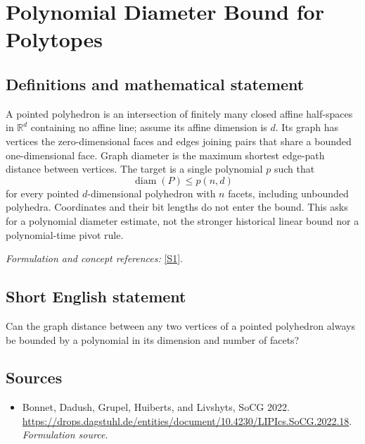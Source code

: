 \documentclass[11pt]{article}
\begin{document}
\section*{\texorpdfstring{Polynomial Diameter Bound for Polytopes}{Polynomial Diameter Bound for Polytopes}}\label{213}
\subsection{Definitions and mathematical statement}
A pointed polyhedron is an intersection of finitely many closed affine half-spaces in ${\mathbb{R}}^d$ containing no affine line; assume its affine dimension is $d$. Its graph has vertices the zero-dimensional faces and edges joining pairs that share a bounded one-dimensional face. Graph diameter is the maximum shortest edge-path distance between vertices. The target is a single polynomial $p$ such that
\[
 \operatorname{diam}(P)\le p(n,d)
\]
for every pointed $d$-dimensional polyhedron with $n$ facets, including unbounded polyhedra. Coordinates and their bit lengths do not enter the bound. This asks for a polynomial diameter estimate, not the stronger historical linear bound nor a polynomial-time pivot rule.
\par\smallskip\textit{Formulation and concept references:} \href{https://drops.dagstuhl.de/entities/document/10.4230/LIPIcs.SoCG.2022.18}{[S1]}.

\subsection{Short English statement}
Can the graph distance between any two vertices of a pointed polyhedron always be bounded by a polynomial in its dimension and number of facets?
\subsection{Sources}
\begin{itemize}
\item[S1]Bonnet, Dadush, Grupel, Huiberts, and Livshyts, SoCG 2022.
\url{https://drops.dagstuhl.de/entities/document/10.4230/LIPIcs.SoCG.2022.18}.
\textit{Formulation source.}
\end{itemize}
\end{document}
